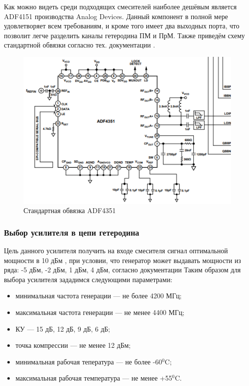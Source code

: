 \documentclass[utf8x, 14pt, oneside, a4paper]{article}
\begin{document}
				Как можно видеть среди подходящих смесителей наиболее дешёвым является ADF4151 производства Analog Devices. Данный компонент в полной мере удовлетворяет всем требованиям, и кроме того имеет два выходных порта, что позволит легче разделить каналы гетеродина ПМ и ПрМ. Также приведём схему стандартной обвязки согласно тех. документации \cite{bib:docs:ADF4351}.
				
				\begin{figure}[H]
					\centering
					\includegraphics[width=0.7\linewidth]{"Рисунки/Доки/ADF4351"}
					\caption{Стандартная обвязка ADF4351}
					\label{fig:doc:ADF4351}
				\end{figure}
			
			\subsubsection{Выбор усилителя в цепи гетеродина}
				Цель данного усилителя получить на входе смесителя сигнал оптимальной мощности в 10 дБм \cite{bib:docs:HMC218b}, при условии, что генератор может выдавать мощности из ряда: -5 дБм, -2 дБм, 1 дБм, 4 дБм, согласно документации \cite{bib:docs:ADF4351} Таким образом для выбора усилителя зададимся следующими параметрами:
				
				\begin{itemize}
					\item минимальная частота генерации --- не более 4200 МГц;
					\item максимальная частота генерации --- не менее 4400 МГц;
					\item КУ --- 15 дБ, 12 дБ, 9 дБ, 6 дБ;
					\item точка компрессии --- не менее 12 дБм;
					\item минимальная рабочая тепература --- не более -60$^0$C;
					\item максимальная рабочая температура --- не менее +55$^0$C.
				\end{itemize}
				
\end{document}
